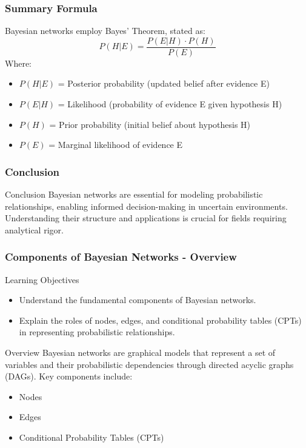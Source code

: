 \documentclass[aspectratio=169]{beamer}
\begin{document}
\begin{frame}[fragile]
    \frametitle{Summary Formula}
    Bayesian networks employ Bayes' Theorem, stated as:
    \begin{equation}
        P(H | E) = \frac{P(E | H) \cdot P(H)}{P(E)}
    \end{equation}
    Where:
    \begin{itemize}
        \item $P(H | E)$ = Posterior probability (updated belief after evidence E)
        \item $P(E | H)$ = Likelihood (probability of evidence E given hypothesis H)
        \item $P(H)$ = Prior probability (initial belief about hypothesis H)
        \item $P(E)$ = Marginal likelihood of evidence E
    \end{itemize}
\end{frame}

\begin{frame}[fragile]
    \frametitle{Conclusion}
    \begin{block}{Conclusion}
        Bayesian networks are essential for modeling probabilistic relationships, enabling informed decision-making in uncertain environments. Understanding their structure and applications is crucial for fields requiring analytical rigor.
    \end{block}
\end{frame}

\begin{frame}[fragile]
    \frametitle{Components of Bayesian Networks - Overview}
    \begin{block}{Learning Objectives}
        \begin{itemize}
            \item Understand the fundamental components of Bayesian networks.
            \item Explain the roles of nodes, edges, and conditional probability tables (CPTs) in representing probabilistic relationships.
        \end{itemize}
    \end{block}

    \begin{block}{Overview}
        Bayesian networks are graphical models that represent a set of variables and their probabilistic dependencies through directed acyclic graphs (DAGs). Key components include:
        \begin{itemize}
            \item Nodes
            \item Edges
            \item Conditional Probability Tables (CPTs)
        \end{itemize}
    \end{block}
\end{frame}
\end{document}
